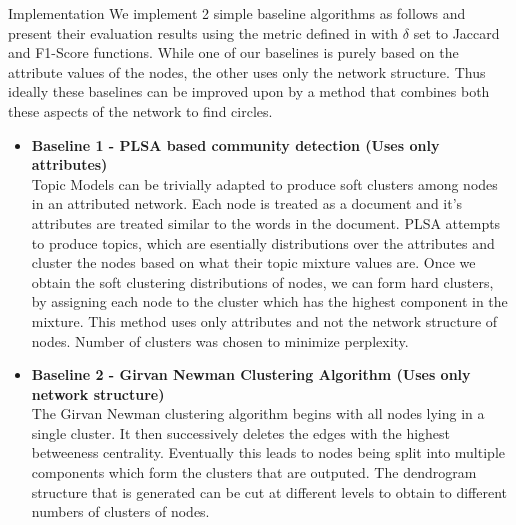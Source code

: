 \documentclass[11pt]{article}
\begin{document}
\begin{section}{Implementation}
We implement 2 simple baseline algorithms as follows and present their evaluation results using the metric defined in \cite{cesna} with $\delta$ set to Jaccard and F1-Score functions. While one of our baselines is purely based on the attribute values of the nodes, the other uses only the network structure. Thus ideally these baselines can be improved upon by a method that combines both these aspects of the network to find circles.
\begin{itemize}
\item \textbf{Baseline 1 - PLSA based community detection (Uses only attributes)\\}
Topic Models can be trivially adapted to produce soft clusters among nodes in an attributed network. Each node is treated as a document and it's attributes are treated similar to the words in the document. PLSA attempts to produce topics, which are esentially distributions over the attributes and cluster the nodes based on what their topic mixture values are. Once we obtain the soft clustering distributions of nodes, we can form hard clusters, by assigning each node to the cluster which has the highest component in the mixture. This method uses only attributes and not the network structure of nodes. Number of clusters was chosen to minimize perplexity.
\item \textbf{Baseline 2 - Girvan Newman Clustering Algorithm (Uses only network structure)\\}
The Girvan Newman clustering algorithm begins with all nodes lying in a single cluster. It then successively deletes the edges with the highest betweeness centrality. Eventually this leads to nodes being split into multiple components which form the clusters that are outputed. The dendrogram structure that is generated can be cut at different levels to obtain to different numbers of clusters of nodes.
\end{itemize}

\end{section}
\end{document}
